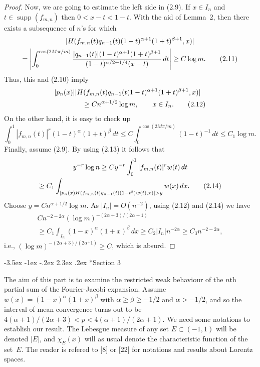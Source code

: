 \documentclass[10pt,a4paper]{article}
\makeatletter
\newcommand{\supp}{\operatorname{supp}}
\renewcommand\section{\@startsection {section}{1}{\z@}%
                                   {-3.5ex \@plus -1ex \@minus -.2ex}%
                                   {2.3ex \@plus.2ex}%
                                   {\centering \normalfont\large\scshape}}
\theoremstyle{plain}
\theoremstyle{remark}
\makeatother
\begin{document}
\begin{proof}
Now, we are going to estimate the left side in (2.9).
If $x \in I_{n}$ and $t \in \supp(f_{m,n})$ then $0 < x-t < 1-t$.
With the aid of Lemma~2, then there exists a subsequence of $n$'s
for which
\begin{multline}
|H(f_{m,n}(t)q_{n-1}(t)(1-t)^{\alpha+1} (1+t)^{\beta+1},x)| \notag \\
= \left| \int_{0}^{\cos(2M\pi/m)}
\frac{|q_{n-1}(t)|(1-t)^{\alpha+1} (1+t)^{\beta+1}}
{(1-t)^{\alpha/2+1/4}(x-t)}\,dt \right| \geq C\log m.
\tag{2.11}
\end{multline}
Thus, this and (2.10) imply
\begin{align}
&|p_{n}(x)| |H(f_{m,n}(t)q_{n-1}(t(1-t)^{\alpha+1} (1+t)^{\beta+1},x)| \notag \\
&\qquad\qquad \geq C n^{\alpha+1/2} \log m, \qquad x \in I_{n}.
\tag{2.12}
\end{align}
On the other hand, it is easy to check up
\begin{equation}
\int_{0}^{1} |f_{m,n}(t)|^{r}(1-t)^{\alpha}(1+t)^{\beta}\,dt
\leq C \int_{0}^{\cos(2M\pi/m)} (1-t)^{-1}\,dt \leq C_{1}\log m.
\tag{2.13}
\end{equation}
Finally, assume (2.9). By using (2.13) it follows that
\begin{multline}
y^{-r} \log n \geq Cy^{-r}  \int_{0}^{1} |f_{m,n}(t)|^{r}w(t)\,dt \notag \\
\geq C_{1} \int_{|p_{n}(x)H(f_{m,n}(t)q_{n-1}(t)(1-t^{2})w(t),x)| > y} w(x)\,dx.
\tag{2.14}
\end{multline}
Choose $y = Cn^{\alpha+1/2} \log m$. As $|I_{n}| = O(n^{-2})$,
using (2.12) and (2.14) we have
\begin{multline*}
Cn^{-2-2\alpha} (\log m)^{-(2\alpha+3)/(2\alpha+1)} \\
\geq C_{1} \int_{I_{n}} (1-x)^{\alpha}(1+x)^{\beta}\,dx
\geq C_{2}|I_{n}|n^{-2\alpha}
\geq C_{3}n^{-2-2\alpha},
\end{multline*}
i.e., $(\log m)^{-(2\alpha+3)/(2\alpha^+1)} \geq C$, which is absurd.
\end{proof}

\section*{Section 3}

The aim of this part is to examine the restricted weak behaviour
of the $n$th partial sum of the Fourier-Jacobi expansion. Assume
$w(x) = (1-x)^{\alpha}(1+x)^{\beta}$ with $\alpha \geq
\beta \geq -1/2$ and $\alpha > -1/2$, and so the
interval of mean convergence turns out to be
$4(\alpha+1)/(2\alpha+3) < p < 4(\alpha+1)/(2\alpha+1)$.
We need some notations to establish our result.
The Lebesgue measure of any set $E \subset (-1,1)$ will be denoted $|E|$,
and $\chi_{E}(x)$ will as usual denote the characteristic
function of the set~$E$. The reader is refered to [8] or [22] for
notations and results about Lorentz spaces.
\end{document}
